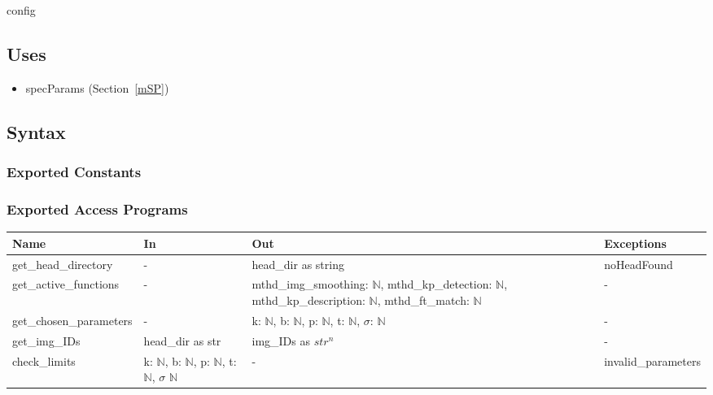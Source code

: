 \documentclass[12pt, titlepage]{article}
\begin{document}
config

\subsection{Uses}
\begin{itemize}
\item specParams (Section~\ref{mSP})
\end{itemize}

\subsection{Syntax}

\subsubsection{Exported Constants}

\subsubsection{Exported Access Programs}
\begin{tabular}{p{4cm} p{4cm} p{4.5cm} p{3.5cm}}
\hline
\textbf{Name} & \textbf{In} & \textbf{Out} & \textbf{Exceptions} \\
\hline
get\_head\_directory 
& - 
& head\_dir as string 
& noHeadFound \\
\hline
get\_active\_functions 
& - 
& mthd\_img\_smoothing: $\mathbb{N}$, \newline 
mthd\_kp\_detection: $\mathbb{N}$, \newline 
mthd\_kp\_description: $\mathbb{N}$, \newline 
mthd\_ft\_match: $\mathbb{N}$
& - \\
\hline
get\_chosen\_parameters & - 
& k: $\mathbb{N}$, \newline 
b: $\mathbb{N}$, \newline  
p: $\mathbb{N}$, \newline 
t: $\mathbb{N}$, \newline 
$\sigma$: $\mathbb{N}$
& - \\
\hline
get\_img\_IDs 
& head\_dir as str 
& img\_IDs as $str^{n}$ 
& - \\
\hline
check\_limits 
& k: $\mathbb{N}$, \newline 
b: $\mathbb{N}$, \newline  
p: $\mathbb{N}$, \newline 
t: $\mathbb{N}$, \newline 
$\sigma$ $\mathbb{N}$
& - 
& invalid\_parameters\\
\hline
\end{tabular}
\end{document}
